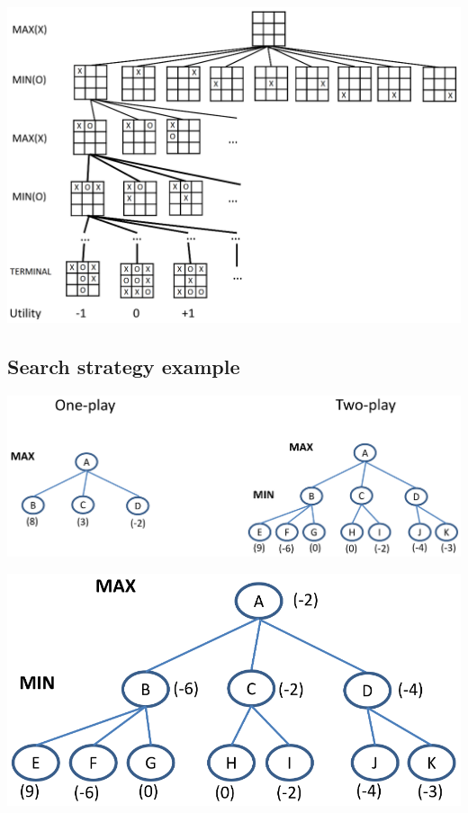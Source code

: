 \documentclass[11pt]{article}
\begin{document}
\begin{center}
\includegraphics[width=.9\linewidth]{./images/tic-tac-toe-game-tree.png}
\end{center}

 \newpage
\subsection{Search strategy example}
\label{sec:orgbaba4f5}
\begin{center}
\includegraphics[width=.9\linewidth]{./images/search-strategy-example-diagram-1.png}
\end{center}

\begin{center}
\includegraphics[width=.9\linewidth]{./images/search-strategy-example-diagram-2.png}
\end{center}
\end{document}
